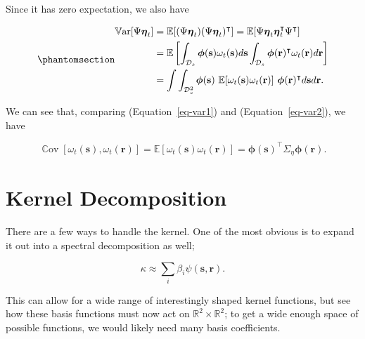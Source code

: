 \documentclass[
  letterpaper,
  DIV=11,
  numbers=noendperiod]{scrartcl}
\begin{document}
Since it has zero expectation, we also have

\begin{equation}\phantomsection\label{eq-var2}{
\begin{split}
\mathop{\mathrm{\mathbb{V}\mathrm{ar}}}[\Psi\boldsymbol{\mathbf{\eta}}_t] &= \mathbb E[(\Psi\boldsymbol{\mathbf{\eta}}_t) (\Psi\boldsymbol{\mathbf{\eta}}_t)^\intercal] = \mathbb E[\Psi\boldsymbol{\mathbf{\eta}}_t\boldsymbol{\mathbf{\eta}}_t^\intercal\Psi^\intercal]\\
&= \mathbb E \left[ \int_{\mathcal D_s} \boldsymbol{\mathbf{\phi}}(\boldsymbol{\mathbf{s}})\omega_t(\boldsymbol{\mathbf{s}})d\boldsymbol{\mathbf{s}} \int_{\mathcal D_s} \boldsymbol{\mathbf{\phi}}(\boldsymbol{\mathbf{r}})^\intercal \omega_t(\boldsymbol{\mathbf{r}}) d\boldsymbol{\mathbf{r}} \right]\\
&= \int\int_{\mathcal D_s^2} \boldsymbol{\mathbf{\phi}}(\boldsymbol{\mathbf{s}})\  \mathbb E[\omega_t(\boldsymbol{\mathbf{s}})\omega_t(\boldsymbol{\mathbf{r}})]\  \boldsymbol{\mathbf{\phi}}(\boldsymbol{\mathbf{r}})^\intercal d\boldsymbol{\mathbf{s}} d \boldsymbol{\mathbf{r}}.
\end{split} 
}\end{equation}

We can see that, comparing (Equation~\ref{eq-var1}) and
(Equation~\ref{eq-var2}), we have

\[
\mathop{\mathrm{\mathbb{C}\mathrm{ov}}}[\omega_t(\boldsymbol{\mathbf{s}}), \omega_t(\boldsymbol{\mathbf{r}})] = \mathbb E[\omega_t(\boldsymbol{\mathbf{s}})\omega_t(\boldsymbol{\mathbf{r}})]= \boldsymbol{\mathbf{\phi}}(\boldsymbol{\mathbf{s}})^\intercal \Sigma_\eta \boldsymbol{\mathbf{\phi}}(\boldsymbol{\mathbf{r}}).
\]

\section{Kernel Decomposition}\label{kernel-decomposition}

There are a few ways to handle the kernel. One of the most obvious is to
expand it out into a spectral decomposition as well;

\[
\kappa \approx \sum_i \beta_i\psi(\boldsymbol{\mathbf{s}}, \boldsymbol{\mathbf{r}}).
\]

This can allow for a wide range of interestingly shaped kernel
functions, but see how these basis functions must now act on
\(\mathbb R^2\times \mathbb R^2\); to get a wide enough space of
possible functions, we would likely need many basis coefficients.
\end{document}
